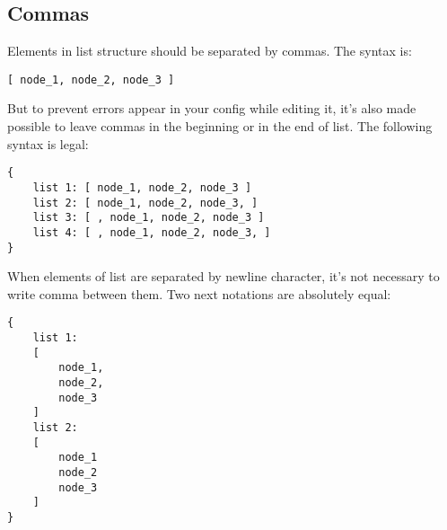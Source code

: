 \subsection{Commas}
Elements in list structure should be separated by commas. The syntax is: 
\begin{lstlisting}[caption = Commas in list (1)]
[ node_1, node_2, node_3 ]
\end{lstlisting}
But to prevent errors appear in your config while editing it, it's also made possible to leave commas in the beginning or in the end  of list. The following syntax is legal:
\begin{lstlisting}[caption = Commas in list (2)]
{
	list 1: [ node_1, node_2, node_3 ]
	list 2: [ node_1, node_2, node_3, ]
	list 3: [ , node_1, node_2, node_3 ]
	list 4: [ , node_1, node_2, node_3, ]
}
\end{lstlisting}

When elements of list are separated by newline character, it's not necessary to write comma between them. Two next notations are absolutely equal: \\
\begin{minipage}{0.45\textwidth}
\begin{lstlisting}[caption = Commas in list (3)]
{
	list 1:
	[
		node_1,
		node_2,
		node_3
	]
	list 2:
	[
		node_1
		node_2
		node_3
	]
}
\end{lstlisting}
\end{minipage}



